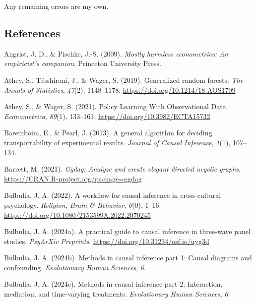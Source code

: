 \documentclass[
  single column]{article}
\newlength{\cslhangindent}
\newenvironment{CSLReferences}[2] %
 {\begin{list}{}{%
  \setlength{\itemindent}{0pt}
  \setlength{\leftmargin}{0pt}
  \setlength{\parsep}{0pt}
  \ifodd #1
   \setlength{\leftmargin}{\cslhangindent}
   \setlength{\itemindent}{-1\cslhangindent}
  \fi
  \setlength{\itemsep}{#2\baselineskip}}}
 {\end{list}}
\begin{document}
Any remaining errors are my own.

\newpage{}

\subsection{References}\label{references}

\label{refs}
\begin{CSLReferences}{1}{0}
Angrist, J. D., \& Pischke, J.-S. (2009). \emph{Mostly harmless
econometrics: An empiricist's companion}. Princeton University Press.

Athey, S., Tibshirani, J., \& Wager, S. (2019). Generalized random
forests. \emph{The Annals of Statistics}, \emph{47}(2), 1148--1178.
\url{https://doi.org/10.1214/18-AOS1709}

Athey, S., \& Wager, S. (2021). Policy Learning With Observational Data.
\emph{Econometrica}, \emph{89}(1), 133--161.
\url{https://doi.org/10.3982/ECTA15732}

Bareinboim, E., \& Pearl, J. (2013). A general algorithm for deciding
transportability of experimental results. \emph{Journal of Causal
Inference}, \emph{1}(1), 107--134.

Barrett, M. (2021). \emph{Ggdag: Analyze and create elegant directed
acyclic graphs}. \url{https://CRAN.R-project.org/package=ggdag}

Bulbulia, J. A. (2022). A workflow for causal inference in
cross-cultural psychology. \emph{Religion, Brain \& Behavior},
\emph{0}(0), 1--16. \url{https://doi.org/10.1080/2153599X.2022.2070245}

Bulbulia, J. A. (2024a). A practical guide to causal inference in
three-wave panel studies. \emph{PsyArXiv Preprints}.
\url{https://doi.org/10.31234/osf.io/uyg3d}

Bulbulia, J. A. (2024b). Methods in causal inference part 1: Causal
diagrams and confounding. \emph{Evolutionary Human Sciences}, \emph{6}.

Bulbulia, J. A. (2024c). Methods in causal inference part 2:
Interaction, mediation, and time-varying treatments. \emph{Evolutionary
Human Sciences}, \emph{6}.


\end{CSLReferences}
\end{document}
